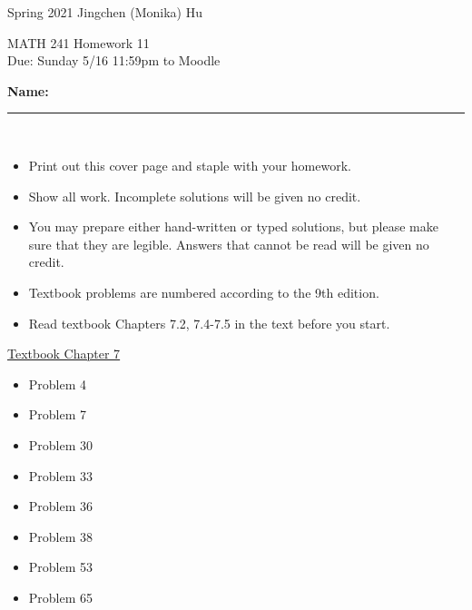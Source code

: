 \documentclass[11pt]{article}
\begin{document}
\enlargethispage{\baselineskip}

Spring 2021 \hfill Jingchen (Monika) Hu\\

\begin{center}
{\huge MATH 241 Homework 11}	\\
Due: Sunday 5/16 11:59pm to Moodle
\end{center}
\vspace{0.5cm}

\textbf{Name:} \rule{6cm}{0.5pt}\\


{\bf
\begin{itemize}
\item Print out this cover page and staple with your homework.
\item Show all work. Incomplete solutions will be given no credit.
\item You may prepare either hand-written or typed solutions, but please make sure that they are legible.
Answers that cannot be read will be given no credit.
\item Textbook problems are numbered according to the 9th edition.
\item Read textbook Chapters 7.2, 7.4-7.5 in the text before you start.

\end{itemize}
}


\underline{Textbook  Chapter 7   }

\begin{itemize}

    \item
    Problem 4

    \item
    Problem 7

    \item
    Problem 30

    \item
    Problem 33

    \item
    Problem 36

    \item
    Problem 38

    \item
    Problem 53

    \item
    Problem 65


%
%


\end{itemize}
\end{document}
